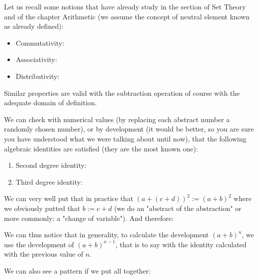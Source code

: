 	Let us recall some notions that have already study in the section of Set Theory and of the chapter Arithmetic (we assume the concept of neutral element known as already defined):
	\begin{itemize}
		\item Commutativity:
		
		
		\item Associativity:
		
		
		\item Distributivity:
		
	\end{itemize}
	Similar properties are valid with the subtraction operation of course with the adequate domain of definition.
	
	\pagebreak
	We can check with numerical values (by replacing each abstract number a randomly chosen number), or by development (it would be better, so you are sure you have understood what we were talking about until now), that the following algebraic identities are satisfied (they are the most known one):
	\begin{enumerate}
		\item Second degree identity:
		
		\item Third degree identity:
		
	\end{enumerate}
	\begin{tcolorbox}[title=Remark,colframe=black,arc=10pt]
	We can very well put that in practice that $(a+(c+d))^2:=(a+b)^2$ where we obviously putted that $b:=c+d$ (we do an "abstract of the abstraction" or more commonly: a "change of variable"). And therefore:
	
	\end{tcolorbox}
	We can thus notice that in generality, to calculate the development $(a+b)^n$, we use the development of $(a+b)^{n-1}$, that is to say with the identity calculated with the previous value of $n$.
	
	We can also see a pattern if we put all together:
	
